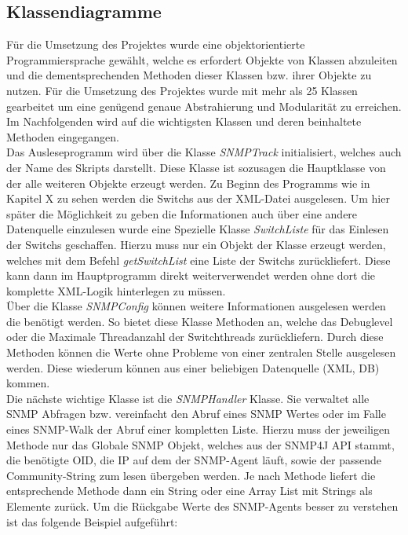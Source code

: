 \subsection{Klassendiagramme}
\label{subsec:classdiagrams}

Für die Umsetzung des Projektes wurde eine objektorientierte Programmiersprache gewählt, welche es erfordert Objekte von Klassen abzuleiten und die dementsprechenden Methoden dieser Klassen bzw. ihrer Objekte zu nutzen. Für die Umsetzung des Projektes wurde mit mehr als 25 Klassen gearbeitet um eine genügend genaue Abstrahierung und Modularität zu erreichen. Im Nachfolgenden wird auf die wichtigsten Klassen und deren beinhaltete Methoden eingegangen.\\
Das Ausleseprogramm wird über die Klasse \textit{SNMPTrack } initialisiert, welches auch der Name des Skripts darstellt. Diese Klasse ist sozusagen die Hauptklasse von der alle weiteren Objekte erzeugt werden. Zu Beginn des Programms wie in Kapitel X zu sehen werden die Switchs aus der XML-Datei ausgelesen. Um hier später die Möglichkeit zu geben die Informationen auch über eine andere Datenquelle einzulesen wurde eine Spezielle Klasse \textit{SwitchListe} für das Einlesen der Switchs geschaffen. Hierzu muss nur ein Objekt der Klasse erzeugt werden, welches mit dem Befehl \textit{getSwitchList} eine Liste der Switchs zurückliefert. Diese kann dann im Hauptprogramm direkt weiterverwendet werden ohne dort die komplette XML-Logik hinterlegen zu müssen.\\
Über die Klasse \textit{SNMPConfig} können weitere Informationen ausgelesen werden die benötigt werden. So bietet diese Klasse Methoden an, welche das Debuglevel oder die Maximale Threadanzahl der Switchthreads zurückliefern. Durch diese Methoden können die Werte ohne Probleme von einer zentralen Stelle ausgelesen werden. Diese wiederum können aus einer beliebigen Datenquelle (XML, DB) kommen.\\
Die nächste wichtige Klasse ist die \textit{SNMPHandler} Klasse. Sie verwaltet alle SNMP Abfragen bzw. vereinfacht den Abruf eines SNMP Wertes oder im Falle eines SNMP-Walk der Abruf einer kompletten Liste. Hierzu muss der jeweiligen Methode nur das Globale SNMP Objekt, welches aus der SNMP4J API stammt, die benötigte OID, die IP auf dem der SNMP-Agent läuft, sowie der passende Community-String zum lesen übergeben werden. Je nach Methode liefert die entsprechende Methode dann ein String oder eine Array List mit Strings als Elemente zurück. Um die Rückgabe Werte des SNMP-Agents besser zu verstehen ist das folgende Beispiel aufgeführt:\\


